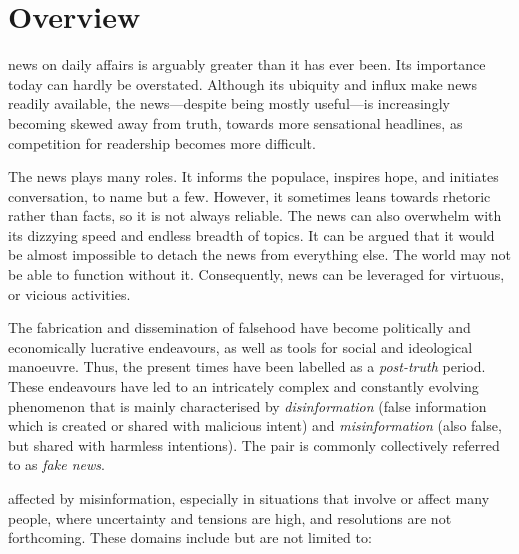 
\chapter{Overview}\label{ch:overview}
\vspace*{-\baselineskip}
 news on daily affairs is arguably greater than it has ever been. Its importance today can hardly be overstated. Although its ubiquity and influx make news readily available, the news—despite being mostly useful—is increasingly becoming skewed away from truth, towards more sensational headlines, as competition for readership becomes more difficult.

The news plays many roles. It informs the populace, inspires hope, and initiates conversation, to name but a few. However, it sometimes leans towards rhetoric rather than facts, so it is not always reliable. The news can also overwhelm with its dizzying speed and endless breadth of topics. It can be argued that it would be almost impossible to detach the news from everything else. The world may not be able to function without it. Consequently, news can be leveraged for virtuous, or vicious activities.

The fabrication and dissemination of falsehood have become politically and economically lucrative endeavours, as well as tools for social and ideological manoeuvre. Thus, the present times have been labelled as a \emph{post-truth} period. These endeavours have led to an intricately complex and constantly evolving phenomenon that is mainly characterised by \emph{disinformation} (false information which is created or shared with malicious intent) and \emph{misinformation} (also false, but shared with harmless intentions). The pair is commonly collectively referred to as \emph{fake news}.

 affected by misinformation, especially in situations that involve or affect many people, where uncertainty and tensions are high, and resolutions are not forthcoming. These domains include but are not limited to:

